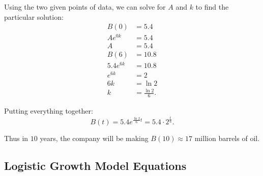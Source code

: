 \documentclass[12pt]{article}
\begin{document}
\begin{enumerate}
	Using the two given points of data, we can solve for $A$ and $k$ to find the particular solution:
	\begin{align*}
		B(0) &= 5.4 \\
		A e^{0k} &= 5.4 \\
		A &= 5.4 \\[12pt]
		B(6) &= 10.8 \\
		5.4 e^{6k} &= 10.8 \\
		e^{6k} &= 2 \\
		6k &= \ln 2 \\
		k &= \frac{\ln 2}{6}.
	\end{align*}

	Putting everything together:
	\[ B(t) = 5.4 e^{\frac{\ln 2}{6} t} = 5.4 \cdot 2^{\frac{t}{6}}. \]

	Thus in $10$ years, the company will be making $B(10) \approx 17$ million barrels of oil.
\end{enumerate}

\subsection{Logistic Growth Model Equations}
\end{document}
